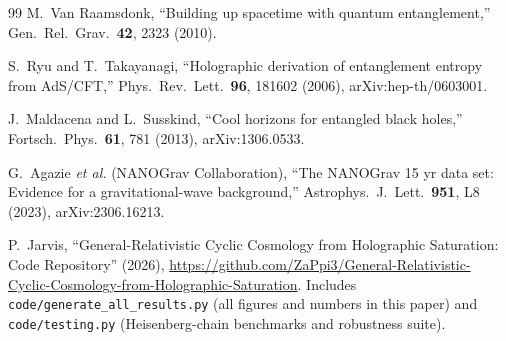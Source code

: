 \documentclass[reprint,superscriptaddress,amsmath,amssymb,aps,prd,showkeys,nofootinbib]{revtex4-2}
\begin{document}
\begin{thebibliography}{99}
M.~Van Raamsdonk,
``Building up spacetime with quantum entanglement,''
Gen.\ Rel.\ Grav.\ \textbf{42}, 2323 (2010).

S.~Ryu and T.~Takayanagi,
``Holographic derivation of entanglement entropy from AdS/CFT,''
Phys.\ Rev.\ Lett.\ \textbf{96}, 181602 (2006),
arXiv:hep-th/0603001.

J.~Maldacena and L.~Susskind,
``Cool horizons for entangled black holes,''
Fortsch.\ Phys.\ \textbf{61}, 781 (2013),
arXiv:1306.0533.

G.~Agazie \textit{et al.} (NANOGrav Collaboration),
``The NANOGrav 15 yr data set: Evidence for a gravitational-wave background,''
Astrophys.\ J.\ Lett.\ \textbf{951}, L8 (2023),
arXiv:2306.16213.

P.~Jarvis,
``General-Relativistic Cyclic Cosmology from Holographic Saturation: Code Repository''
(2026),
\url{https://github.com/ZaPpi3/General-Relativistic-Cyclic-Cosmology-from-Holographic-Saturation}.
Includes \texttt{code/generate\_all\_results.py} (all figures and numbers in this paper)
and \texttt{code/testing.py} (Heisenberg-chain benchmarks and robustness suite).

\end{thebibliography}
\end{document}

